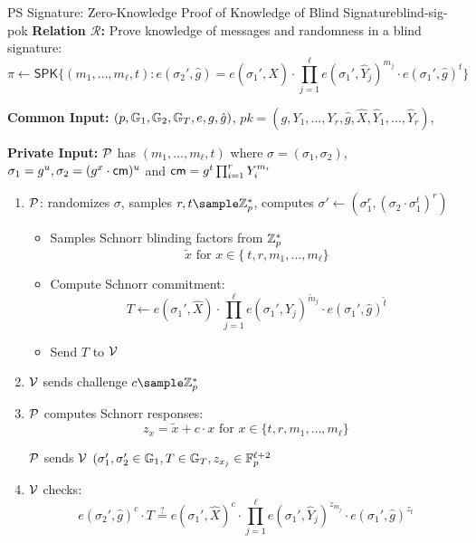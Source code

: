 \begin{protocol}{PS Signature: Zero-Knowledge Proof of Knowledge of Blind Signature}{blind-sig-pok}
    \textbf{Relation $\mathcal{R}$:} Prove knowledge of messages and randomness in a blind signature:
        \[
        \pi \gets \mathsf{SPK}\{(m_1,\ldots,m_\ell,t): e(\sigma_2', \hat{g}) = e(\sigma_1',\hat{X}) \cdot \prod_{j=1}^\ell e(\sigma_1', \widehat{Y}_j)^{m_j} \cdot e(\sigma_1', \hat{g})^t\}
        \]
    
    \textbf{Common Input:} $(p, \mathbb{G}_1, \mathbb{G}_2, \mathbb{G}_T, e, g, \hat{g})$, $pk = (g, Y_1,\ldots,Y_r, \hat{g}, \hat{X}, \widehat{Y}_1,\ldots,\widehat{Y}_r)$, 
    
    \textbf{Private Input:} $\mathcal{P}$ has $(m_1,\ldots,m_\ell, t)$ where $\sigma = (\sigma_1, \sigma_2)$, $\sigma_1 = g^u, \sigma_2 = (g^x \cdot \mathsf{cm})^u$ and $\mathsf{cm} = g^t\prod_{i=1}^rY_i^{m_i}$
    \vspace{1em}
    \begin{enumerate}
        \item $\mathcal{P}$: randomizes $\sigma$, samples $r,t \sample \Z_p^*$, computes $\sigma' \gets (\sigma_1^r, (\sigma_2 \cdot \sigma_1^t)^r)$\
        \begin{itemize}
            \item Samples Schnorr blinding factors from $\mathbb{Z}_p^*$
            \[
            \tilde{x} \text{ for } x \in \{\ t, r, m_1, \ldots, m_{\ell}\}
            \]
            \item Compute Schnorr commitment:
            \[
            T \gets e(\sigma_1',\hat{X}) \cdot \prod_{j=1}^\ell e(\sigma_1', \widehat{Y}_j)^{\tilde{m}_j} \cdot e(\sigma_1', \hat{g})^{\tilde{t}}
            \]
            \item Send $T$ to $\mathcal{V}$
        \end{itemize}
        
        \item $\mathcal{V}$ sends challenge $c \sample \Z_p^*$
        
        \item $\mathcal{P}$ computes Schnorr responses:
        \[
        z_{x} = \tilde{x} + c \cdot x \text{ for } x \in \{t,r, m_1, \ldots, m_\ell\}
        \]

        $\mathcal{P}$ sends $\mathcal{V}$ $(\sigma_1', \sigma_2' \in \mathbb{G}_1, T \in \mathbb{G}_T, z_{x_j} \in \mathbb{F}_p^{\ell + 2} $
        
        \item $\mathcal{V}$ checks:
        \[
        e(\sigma_2', \hat{g})^c \cdot T \stackrel{?}{=} e(\sigma_1',\hat{X})^c \cdot \prod_{j=1}^\ell e(\sigma_1', \widehat{Y}_j)^{z_{m_j}} \cdot e(\sigma_1', \hat{g})^{z_t}
        \]
    \end{enumerate}
\end{protocol}

